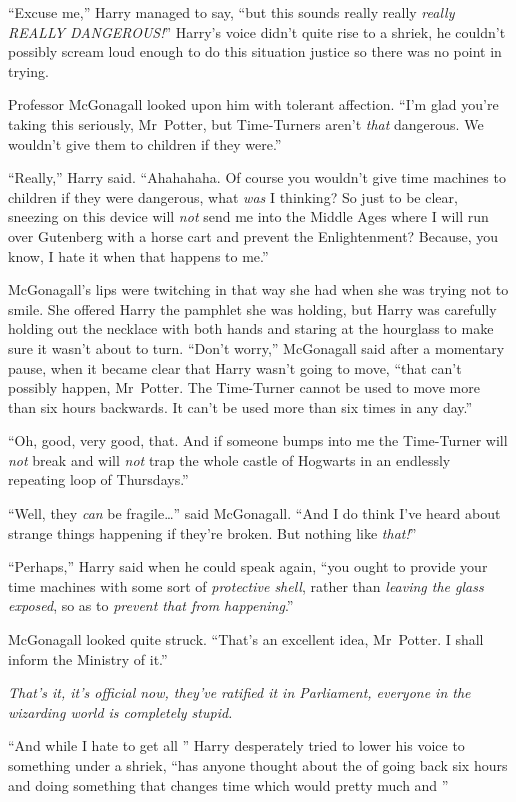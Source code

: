 “Excuse me,” Harry managed to say, “but this sounds really really \emph{really REALLY DANGEROUS!}” Harry’s voice didn’t quite rise to a shriek, he couldn’t possibly scream loud enough to do this situation justice so there was no point in trying.

Professor McGonagall looked upon him with tolerant affection. “I’m glad you’re taking this seriously, Mr~Potter, but Time-Turners aren’t \emph{that} dangerous. We wouldn’t give them to children if they were.”

“Really,” Harry said. “Ahahahaha. Of course you wouldn’t give time machines to children if they were dangerous, what \emph{was} I thinking? So just to be clear, sneezing on this device will \emph{not} send me into the Middle Ages where I will run over Gutenberg with a horse cart and prevent the Enlightenment? Because, you know, I hate it when that happens to me.”

McGonagall’s lips were twitching in that way she had when she was trying not to smile. She offered Harry the pamphlet she was holding, but Harry was carefully holding out the necklace with both hands and staring at the hourglass to make sure it wasn’t about to turn. “Don’t worry,” McGonagall said after a momentary pause, when it became clear that Harry wasn’t going to move, “that can’t possibly happen, Mr~Potter. The Time-Turner cannot be used to move more than six hours backwards. It can’t be used more than six times in any day.”

“Oh, good, very good, that. And if someone bumps into me the Time-Turner will \emph{not} break and will \emph{not} trap the whole castle of Hogwarts in an endlessly repeating loop of Thursdays.”

“Well, they \emph{can} be fragile…” said McGonagall. “And I do think I’ve heard about strange things happening if they’re broken. But nothing like \emph{that!}”

“Perhaps,” Harry said when he could speak again, “you ought to provide your time machines with some sort of \emph{protective shell}, rather than \emph{leaving the glass exposed}, so as to \emph{prevent that from happening}.”

McGonagall looked quite struck. “That’s an excellent idea, Mr~Potter. I shall inform the Ministry of it.”

\emph{That’s it, it’s official now, they’ve ratified it in Parliament, everyone in the wizarding world is completely stupid.}

“And while I hate to get all ” Harry desperately tried to lower his voice to something under a shriek, “has anyone thought about the  of going back six hours and doing something that changes time which would pretty much  and ”

